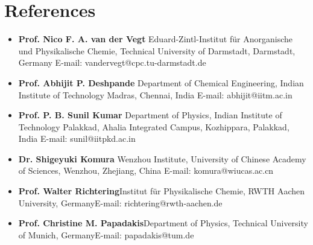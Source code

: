 \documentclass[a4paper,14pt]{article}
\begin{document}
\section*{References}
\begin{itemize}
\item
\textbf{Prof. Nico F. A. van der Vegt}\newline
Eduard-Zintl-Institut f{\"u}r Anorganische und Physikalische Chemie, Technical University of Darmstadt, Darmstadt, Germany\newline
E-mail: vandervegt@cpc.tu-darmstadt.de
\item
\textbf{Prof. Abhijit P. Deshpande}\newline
Department of Chemical Engineering, Indian Institute of Technology Madras, Chennai, India\newline
E-mail: abhijit@iitm.ac.in
\item
\textbf{Prof. P. B. Sunil Kumar}\newline
Department of Physics, Indian Institute of Technology Palakkad, Ahalia Integrated Campus, Kozhippara, Palakkad, India\newline
E-mail: sunil@iitpkd.ac.in
\item
\textbf{Dr. Shigeyuki Komura}\newline
Wenzhou Institute, University of Chinese Academy of Sciences, Wenzhou, Zhejiang, China\newline
E-mail: komura@wiucas.ac.cn
\item
\textbf{Prof. Walter Richtering}\newline Institut f{\"u}r Physikalische Chemie,
RWTH Aachen University, Germany\newline E-mail: richtering@rwth-aachen.de
\item
\textbf{Prof. Christine M. Papadakis}\newline Department of Physics,
Technical University of Munich, Germany\newline E-mail: papadakis@tum.de
\end{itemize}
\end{document}
